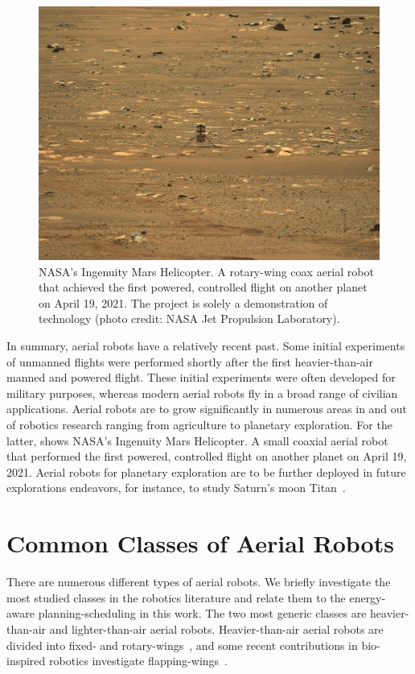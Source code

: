 \begin{figure}[t]
  \centering
  \includegraphics[width=.7\textwidth]{pictures/jpegPIA24550}
  \caption[NASA's Ingenuity Mars Helicopter]{NASA's Ingenuity Mars Helicopter. A rotary-wing coax aerial robot that achieved the first powered, controlled flight on another planet on April 19, 2021. The project is solely a demonstration of technology {\scriptsize(photo credit: NASA Jet Propulsion Laboratory)}.}   
  \label{fig:ingenuity}
\end{figure}
In summary, aerial robots have a relatively recent past. Some initial experiments of unmanned flights were performed shortly after the first heavier-than-air manned and powered flight. These initial experiments were often developed for military purposes, whereas modern aerial robots fly in a broad range of civilian applications. Aerial robots are to grow significantly in numerous areas in and out of robotics research ranging from agriculture to planetary exploration. For the latter,  shows NASA's Ingenuity Mars Helicopter. A small coaxial aerial robot that performed the first powered, controlled flight on another planet on April 19, 2021. Aerial robots for planetary exploration are to be further deployed in future explorations endeavors, for instance, to study Saturn's moon Titan~\citep{voosen2019nasa}.


\section{Common Classes of Aerial Robots}
\label{sec:aerial-robo-types}

There are numerous different types of aerial robots. We briefly investigate the most studied classes in the robotics literature and relate them to the energy-aware planning-scheduling in this work. The two most generic classes are heavier-than-air and lighter-than-air aerial robots. Heavier-than-air aerial robots are divided into fixed- and rotary-wings~\citep{siciliano2016springer}, and some recent contributions in bio-inspired robotics investigate flapping-wings~\citep{floreano2015science}. 

